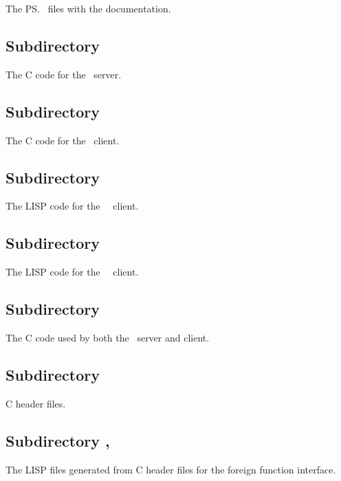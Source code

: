 The \ps\ files with the documentation.

\subsection*{Subdirectory \protect{}}

The C code for the \plob\ server.

\subsection*{Subdirectory \protect{}}

The C code for the \plob\ client.

\subsection*{Subdirectory \protect{}}

The LISP code for the \plob\ \allegrocl\ client.

\subsection*{Subdirectory \protect{}}

The LISP code for the \plob\ \lwcl\ client.

\subsection*{Subdirectory \protect{}}

The C code used by both the \plob\ server and client.

\subsection*{Subdirectory \protect{}} C header files.

\subsection*{Subdirectory \protect{}, 
}

The LISP files generated from C header files for the foreign function
interface.

